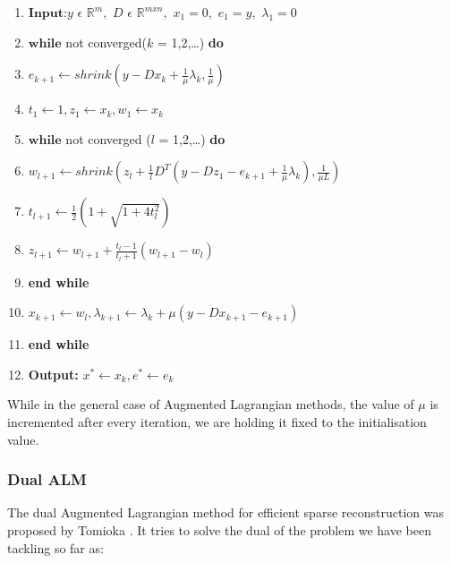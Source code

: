 \documentclass{article} %
\begin{document}
\begin{enumerate}
\item $\textbf{Input:}y$ $\epsilon$ $\mathbb{R}^m,$ $D$ $\epsilon$ $\mathbb{R}^{mxn},$ $x_1 = 0,$ $e_1 = y,$ $\lambda_1 = 0$
\item $\textbf{while}$ not converged($k$ = 1,2,\ldots) \textbf{do}
\item \hspace*{.4cm} $e_{k+1} \leftarrow shrink(y - Dx_k + \frac{1}{\mu}\lambda_k, \frac{1}{\mu})$
\item \hspace*{.4cm} $t_1 \leftarrow 1, z_1 \leftarrow x_k, w_1 \leftarrow x_k$
\item \hspace*{.4cm} $\textbf{while}$ not converged ($l$ = 1,2,\ldots) \textbf{do}
\item \hspace*{.8cm} $w_{l+1} \leftarrow shrink(z_l + \frac{1}{l}D^T(y - Dz_1 - e_{k+1} + \frac{1}{\mu}\lambda_k),\frac{1}{\mu L})$
\item \hspace*{.8cm} $t_{l+1} \leftarrow \frac{1}{2}(1 + \sqrt{1+4t_l^2})$
\item \hspace*{.8cm} $z_{l+1} \leftarrow w_{l+1} + \frac{t_l - 1}{t_l + 1}(w_{l+1} - w_l)$
\item \hspace*{.4cm} \textbf{end while}
\item \hspace*{.4cm} $x_{k+1} \leftarrow w_l, \lambda_{k+1} \leftarrow \lambda_k + \mu(y - Dx_{k+1} - e_{k+1})$
\item \textbf{end while}
\item \textbf{Output: } $x^{*} \leftarrow x_k, e^{*} \leftarrow e_k$
\end{enumerate}

While in the general case of Augmented Lagrangian methods, the value of $\mu$ is incremented after every iteration, we are holding it fixed to the initialisation value.

\vspace{-.2cm}
\subsubsection{Dual ALM}
\vspace{-.2cm}
The dual Augmented Lagrangian method for efficient sparse reconstruction was proposed by Tomioka  \citep{tomioka2009dual}. It tries to solve the dual of the problem we have been tackling so far as:
\end{document}
